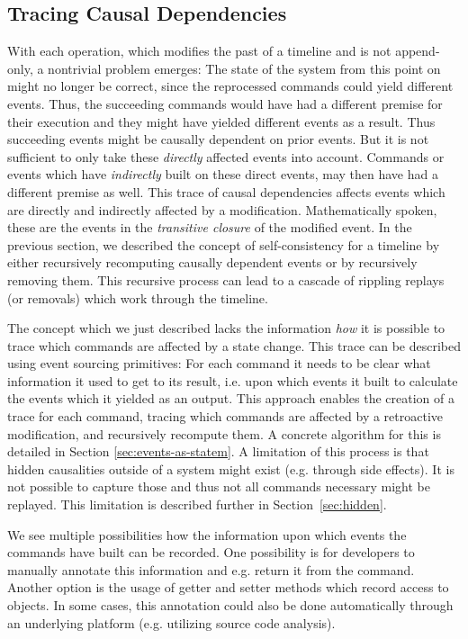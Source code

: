 \subsection{Tracing Causal Dependencies}
\label{sec:dependent}

With each operation, which modifies the past of a timeline and is not append-only,
a nontrivial problem emerges:
The state of the system from this point on might no longer be correct, since the 
reprocessed commands could yield different events. 
Thus, the succeeding commands would have had a different premise for their 
execution and they might have yielded different events as a result. Thus 
succeeding events might be causally dependent on prior events. 
But it is not sufficient to only take these \emph{directly} affected events
into account.
Commands or events which have \emph{indirectly} built on these direct events, 
may then have had a different premise as well. 
This trace of causal dependencies affects events which are directly and indirectly 
affected by a modification. Mathematically spoken, these are the events in the 
\emph{transitive closure} of the modified event.
In the previous section, we described the concept of self-consistency for
a timeline by either recursively recomputing causally dependent events or by 
recursively removing them.
This recursive process can lead to a cascade of rippling replays (or removals) 
which work through the timeline.

The concept which we just described lacks the information \emph{how} it is
possible to trace which commands are affected by a state change. This trace 
can be described using event sourcing primitives: For each command it needs 
to be clear what information it used to get to its result, i.e. upon which 
events it built to calculate the events which it yielded as an output.
This approach enables the creation of a trace for each command, tracing which 
commands are affected by a retroactive modification, and recursively recompute 
them.
A concrete algorithm for this is detailed in Section \ref{sec:events-as-statem}.
A limitation of this process is that hidden causalities outside of a system might 
exist (e.g. through side effects). It is not possible to capture those and 
thus not all commands necessary might be replayed. This limitation is described 
further in \mbox{Section \ref{sec:hidden}.}

We see multiple possibilities how the information upon which events the commands 
have built can be recorded. One possibility is for developers to manually 
annotate this information and e.g. return it from the command. Another option is 
the usage of getter and setter methods which record access to objects.
In some cases, this annotation could also be done automatically through 
an underlying platform (e.g. utilizing source code analysis).

